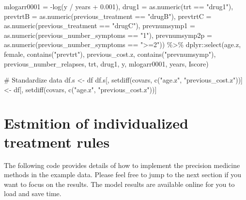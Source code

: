 \documentclass[
  letterpaper,
  DIV=11,
  numbers=noendperiod]{scrreprt}
\newenvironment{Shaded}{\begin{snugshade}}{\end{snugshade}}
\newcommand{\AttributeTok}[1]{\textcolor[rgb]{0.40,0.45,0.13}{#1}}
\newcommand{\CommentTok}[1]{\textcolor[rgb]{0.37,0.37,0.37}{#1}}
\newcommand{\FloatTok}[1]{\textcolor[rgb]{0.68,0.00,0.00}{#1}}
\newcommand{\FunctionTok}[1]{\textcolor[rgb]{0.28,0.35,0.67}{#1}}
\newcommand{\NormalTok}[1]{\textcolor[rgb]{0.00,0.23,0.31}{#1}}
\newcommand{\OtherTok}[1]{\textcolor[rgb]{0.00,0.23,0.31}{#1}}
\newcommand{\SpecialCharTok}[1]{\textcolor[rgb]{0.37,0.37,0.37}{#1}}
\newcommand{\StringTok}[1]{\textcolor[rgb]{0.13,0.47,0.30}{#1}}
\begin{document}
\begin{Shaded}
\begin{Highlighting}[]
         \AttributeTok{mlogarr0001 =} \SpecialCharTok{{-}}\FunctionTok{log}\NormalTok{(y }\SpecialCharTok{/}\NormalTok{ years }\SpecialCharTok{+} \FloatTok{0.001}\NormalTok{),}
         \AttributeTok{drug1 =} \FunctionTok{as.numeric}\NormalTok{(trt }\SpecialCharTok{==} \StringTok{"drug1"}\NormalTok{),}
         \AttributeTok{prevtrtB =} \FunctionTok{as.numeric}\NormalTok{(previous\_treatment }\SpecialCharTok{==} \StringTok{"drugB"}\NormalTok{),}
         \AttributeTok{prevtrtC =} \FunctionTok{as.numeric}\NormalTok{(previous\_treatment }\SpecialCharTok{==} \StringTok{"drugC"}\NormalTok{),}
         \AttributeTok{prevnumsymp1 =} \FunctionTok{as.numeric}\NormalTok{(previous\_number\_symptoms }\SpecialCharTok{==} \StringTok{"1"}\NormalTok{),}
         \AttributeTok{prevnumsymp2p =} \FunctionTok{as.numeric}\NormalTok{(previous\_number\_symptoms }\SpecialCharTok{==} \StringTok{"\textgreater{}=2"}\NormalTok{)) }\SpecialCharTok{\%\textgreater{}\%}
\NormalTok{  dplyr}\SpecialCharTok{::}\FunctionTok{select}\NormalTok{(age.z, female, }\FunctionTok{contains}\NormalTok{(}\StringTok{"prevtrt"}\NormalTok{), previous\_cost.z, }\FunctionTok{contains}\NormalTok{(}\StringTok{"prevnumsymp"}\NormalTok{), }
\NormalTok{                previous\_number\_relapses, trt, drug1, y, mlogarr0001, years, Iscore)}

\CommentTok{\# Standardize data}
\NormalTok{df.s }\OtherTok{\textless{}{-}}\NormalTok{ df}
\NormalTok{df.s[, }\FunctionTok{setdiff}\NormalTok{(covars, }\FunctionTok{c}\NormalTok{(}\StringTok{"age.z"}\NormalTok{, }\StringTok{"previous\_cost.z"}\NormalTok{))] }\OtherTok{\textless{}{-}}\NormalTok{ df[, }\FunctionTok{setdiff}\NormalTok{(covars, }\FunctionTok{c}\NormalTok{(}\StringTok{"age.z"}\NormalTok{, }\StringTok{"previous\_cost.z"}\NormalTok{))]}
\end{Highlighting}
\end{Shaded}

\hypertarget{estmition-of-individualized-treatment-rules}{%
\section{Estmition of individualized treatment
rules}\label{estmition-of-individualized-treatment-rules}}

The following code provides details of how to implement the precision
medicine methods in the example data. Please feel free to jump to the
next section if you want to focus on the results. The model results are
available online for you to load and save time.
\end{document}
